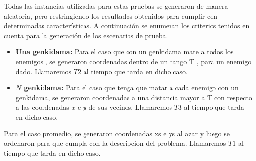             Todas las instancias utilizadas para estas pruebas se generaron de manera aleatoria, pero restringiendo los resultados obtenidos para cumplir con determinadas características. A continuación se enumeran los criterios tenidos en cuenta para la generación de los escenarios de prueba.

            \begin{itemize}
                \item \textbf{Una genkidama:} Para el caso que con un genkidama mate a todos los enemigos , se generaron coordenadas dentro de un rango T , para un enemigo dado. Llamaremos $T2$ al tiempo que tarda en dicho caso.

                \item \textbf{$N$ genkidama:} Para el caso que tenga que matar a cada enemigo con un genkidama, se generaron coordenadas a una distancia mayor a T con respecto a las coordenadas $x$ e $y$ de sus vecinos. Llamaremos $T3$ al tiempo que tarda en dicho caso.

            \end{itemize}

   Para el caso promedio, se generaron coordenadas xs e ys al azar y luego se ordenaron para que cumpla con la descripcion del problema. Llamaremos $T1$ al tiempo que tarda en dicho caso.


    \renewcommand\constante{11.5}

	\begin{figure}[H]
		\centering
		\caption{}
		\label{fig:tiempo_sobre_n}
	\end{figure}

